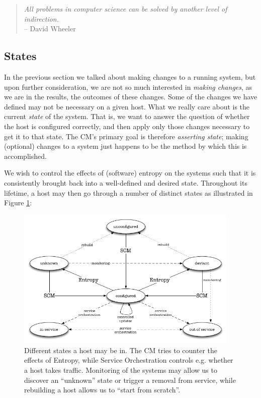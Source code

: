 \begin{quote}
{\em All problems in computer science can be solved by another level of
indirection.}\\
 -- David Wheeler
\end{quote}

\subsection{States}
\label{configuration-management:states-sets:states}

In the previous section we talked about making changes
to a running system, but upon further consideration,
we are not so much interested in {\em making changes},
as we are in the results, the outcomes of these
changes.  Some of the changes we have defined may not
be necessary on a given host.  What we really care
about is the current {\em state} of the system.  That
is, we want to answer the question of whether the host
is configured correctly, and then apply only those
changes necessary to get it to that state.  The CM's
primary goal is therefore {\em asserting state};
making (optional) changes to a system just happens to
be the method by which this is accomplished.

We wish to control the effects of (software) entropy
on the systems such that it is consistently brought
back into a well-defined and desired state.
Throughout its lifetime, a host may then go through a
number of distinct states as illustrated in Figure
\ref{fig:configuration-management:host-states}:

\begin{figure}[!hb]
	\centering
	\includegraphics[width=0.95\textwidth]{07/pics/host-states}
		\caption[Host States in Configuration Management]{
			Different states a host may be in.  The CM tries to
			counter the effects of Entropy, while Service
			Orchestration controls e.g. whether a host takes
			traffic.  Monitoring of the systems may allow us
			to discover an ``unknown'' state or trigger a
			removal from service, while rebuilding a host
			allows us to ``start from scratch''.
			\label{fig:configuration-management:host-states}}
\end{figure}


